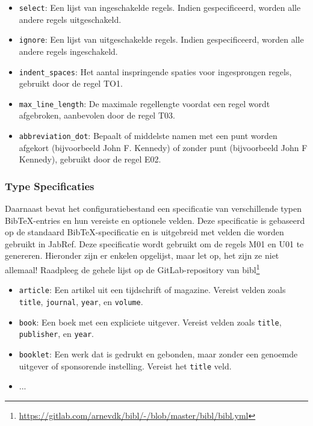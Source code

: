 \begin{itemize}
    \item \texttt{select}: Een lijst van ingeschakelde regels. Indien gespecificeerd, worden alle andere regels uitgeschakeld.
    \item \texttt{ignore}: Een lijst van uitgeschakelde regels. Indien gespecificeerd, worden alle andere regels ingeschakeld.
    \item \texttt{indent\_spaces}: Het aantal inspringende spaties voor ingesprongen regels, gebruikt door de regel TO1.
    \item \texttt{max\_line\_length}: De maximale regellengte voordat een regel wordt afgebroken, aanbevolen door de regel T03.
    \item \texttt{abbreviation\_dot}: Bepaalt of middelste namen met een punt worden afgekort (bijvoorbeeld John F. Kennedy) of zonder punt (bijvoorbeeld John F Kennedy), gebruikt door de regel E02.
\end{itemize}

\subsubsection{Type Specificaties}

Daarnaast bevat het configuratiebestand een specificatie van verschillende typen BibTeX-entries en hun vereiste en optionele velden. Deze specificatie is gebaseerd op de standaard BibTeX-specificatie en is uitgebreid met velden die worden gebruikt in JabRef. Deze specificatie wordt gebruikt om de regels M01 en U01 te genereren.
Hieronder zijn er enkelen opgelijst, maar let op, het zijn ze niet allemaal! Raadpleeg de gehele lijst op de GitLab-repository van bibl\footnote{\url{https://gitlab.com/arnevdk/bibl/-/blob/master/bibl/bibl.yml}}
\begin{itemize}
    \item \texttt{article}: Een artikel uit een tijdschrift of magazine. Vereist velden zoals \texttt{title}, \texttt{journal}, \texttt{year}, en \texttt{volume}.
    \item \texttt{book}: Een boek met een expliciete uitgever. Vereist velden zoals \texttt{title}, \texttt{publisher}, en \texttt{year}.
    \item \texttt{booklet}: Een werk dat is gedrukt en gebonden, maar zonder een genoemde uitgever of sponsorende instelling. Vereist het \texttt{title} veld.
    \item ...
\end{itemize}

